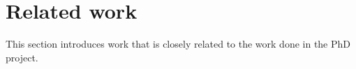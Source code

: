 \chapter{Related work}
\label{relatedwork}

This section introduces work that is closely related to the work done in the
PhD project.


